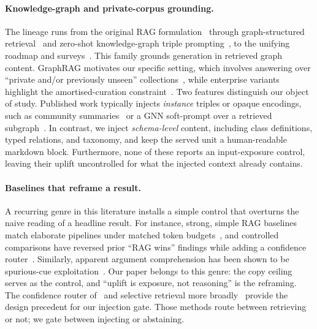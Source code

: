 \documentclass[10pt,twocolumn]{article}
\begin{document}
\paragraph{Knowledge-graph and private-corpus grounding.}
The lineage runs from the original RAG formulation~\cite{lewis2020rag} through graph-structured retrieval~\cite{edge2024graphrag,guo2024lightrag} and zero-shot knowledge-graph triple prompting~\cite{baek2023kaping}, to the unifying roadmap and surveys~\cite{pan2024unifying,peng2024graphragsurvey}. This family grounds generation in retrieved graph content. GraphRAG motivates our specific setting, which involves answering over ``private and/or previously unseen'' collections~\cite{edge2024graphrag}, while enterprise variants highlight the amortised-curation constraint~\cite{jiang2025practicalgraphrag}. Two features distinguish our object of study. Published work typically injects \emph{instance} triples or opaque encodings, such as community summaries~\cite{edge2024graphrag} or a GNN soft-prompt over a retrieved subgraph~\cite{he2024gretriever}. In contrast, we inject \emph{schema-level} content, including class definitions, typed relations, and taxonomy, and keep the served unit a human-readable markdown block. Furthermore, none of these reports an input-exposure control, leaving their uplift uncontrolled for what the injected context already contains.

\paragraph{Baselines that reframe a result.}
A recurring genre in this literature installs a simple control that overturns the naive reading of a headline result. For instance, strong, simple RAG baselines match elaborate pipelines under matched token budgets~\cite{laitenberger2025stronger}, and controlled comparisons have reversed prior ``RAG wins'' findings while adding a confidence router~\cite{li2024ragorlongcontext}. Similarly, apparent argument comprehension has been shown to be spurious-cue exploitation~\cite{niven2019probing}. Our paper belongs to this genre: the copy ceiling serves as the control, and ``uplift is exposure, not reasoning'' is the reframing. The confidence router of~\textcite{li2024ragorlongcontext} and selective retrieval more broadly~\cite{asai2024selfrag,jeong2024adaptiverag,mallen2023trust} provide the design precedent for our injection gate. Those methods route between retrieving or not; we gate between injecting or abstaining.
\end{document}
